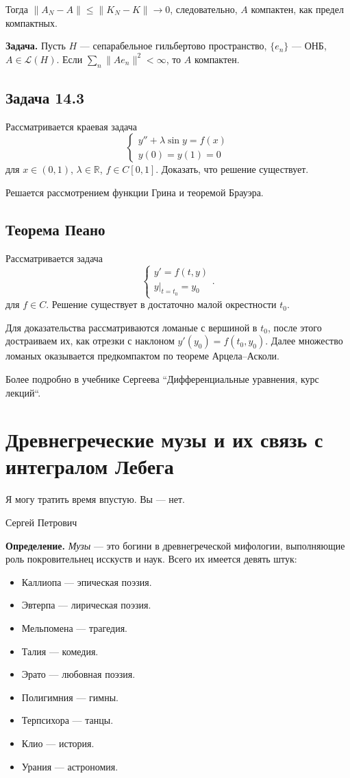 Тогда $\|A_N - A\| \le \|K_N - K\| \to 0$, следовательно, $A$ компактен, как предел компактных.

\QED

\textbf{Задача.} Пусть $H$ --- сепарабельное гильбертово пространство, $\{e_n\}$ --- ОНБ, $A \in \mathcal L(H)$.
Если $\sum_n \|Ae_n\|^2 < \infty$, то $A$ компактен.

\subsection{Задача 14.3}
Рассматривается краевая задача
\[
    \begin{cases}
        y'' + \lambda \sin y = f(x) \\
        y(0) = y(1) = 0
    \end{cases}
\]
для $x \in (0, 1)$, $\lambda \in \mathbb R$, $f \in C[0, 1]$.
Доказать, что решение существует.

Решается рассмотрением функции Грина и теоремой Брауэра.

\subsection{Теорема Пеано}
Рассматривается задача
\[
    \begin{cases}
        y' = f(t, y) \\
        y|_{t = t_0} = y_0
    \end{cases} .
\]
для $f \in C$.
Решение существует в достаточно малой окрестности $t_0$.

Для доказательства рассматриваются ломаные с вершиной в $t_0$, после этого достраиваем их, как отрезки с наклоном $y'(y_0) = f(t_0, y_0)$.
Далее множество ломаных оказывается предкомпактом по теореме Арцела--Асколи.

Более подробно в учебнике Сергеева ``Дифференциальные уравнения, курс лекций``.

\section{Древнегреческие музы и их связь с интегралом Лебега}
\epigraph{Я могу тратить время впустую. Вы --- нет.}{Сергей Петрович}

\textbf{Определение.} \textit{Музы} --- это богини в древнегреческой мифологии, выполняющие роль покровительнец исскуств и наук.
Всего их имеется девять штук:
\begin{itemize}
    \item Каллиопа --- эпическая поэзия.
    \item Эвтерпа --- лирическая поэзия.
    \item Мельпомена --- трагедия.
    \item Талия --- комедия.
    \item Эрато --- любовная поэзия.
    \item Полигимния --- гимны.
    \item Терпсихора --- танцы.
    \item Клио --- история.
    \item Урания --- астрономия.
\end{itemize}

